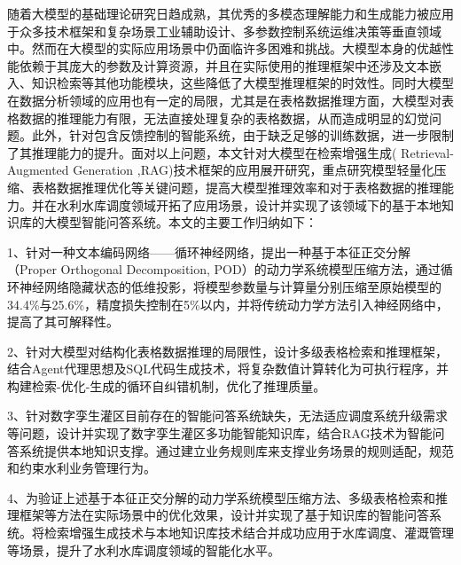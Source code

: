 \begin{cabstract}
    随着大模型的基础理论研究日趋成熟，其优秀的多模态理解能力和生成能力被应用于众多技术框架和复杂场景工业辅助设计、多参数控制系统运维决策等垂直领域中。然而在大模型的实际应用场景中仍面临许多困难和挑战。大模型本身的优越性能依赖于其庞大的参数及计算资源，并且在实际使用的推理框架中还涉及文本嵌入、知识检索等其他功能模块，这些降低了大模型推理框架的时效性。同时大模型在数据分析领域的应用也有一定的局限，尤其是在表格数据推理方面，大模型对表格数据的推理能力有限，无法直接处理复杂的表格数据，从而造成明显的幻觉问题。此外，针对包含反馈控制的智能系统，由于缺乏足够的训练数据，进一步限制了其推理能力的提升。面对以上问题，本文针对大模型在检索增强生成( Retrieval-Augmented Generation ,RAG)技术框架的应用展开研究，重点研究模型轻量化压缩、表格数据推理优化等关键问题，提高大模型推理效率和对于表格数据的推理能力。并在水利水库调度领域开拓了应用场景，设计并实现了该领域下的基于本地知识库的大模型智能问答系统。本文的主要工作归纳如下： 

    1、针对一种文本编码网络——循环神经网络，提出一种基于本征正交分解（Proper Orthogonal Decomposition, POD）的动力学系统模型压缩方法，通过循环神经网络隐藏状态的低维投影，将模型参数量与计算量分别压缩至原始模型的34.4\%与25.6\%，精度损失控制在5\%以内，并将传统动力学方法引入神经网络中，提高了其可解释性。
    
    2、针对大模型对结构化表格数据推理的局限性，设计多级表格检索和推理框架，结合Agent代理思想及SQL代码生成技术，将复杂数值计算转化为可执行程序，并构建检索-优化-生成的循环自纠错机制，优化了推理质量。
    
    3、针对数字孪生灌区目前存在的智能问答系统缺失，无法适应调度系统升级需求等问题，设计并实现了数字孪生灌区多功能智能知识库，结合RAG技术为智能问答系统提供本地知识支撑。通过建立业务规则库来支撑业务场景的规则适配，规范和约束水利业务管理行为。

    4、为验证上述基于本征正交分解的动力学系统模型压缩方法、多级表格检索和推理框架等方法在实际场景中的优化效果，设计并实现了基于知识库的智能问答系统。将检索增强生成技术与本地知识库技术结合并成功应用于水库调度、灌溉管理等场景，提升了水利水库调度领域的智能化水平。
    \end{cabstract}
    
    
